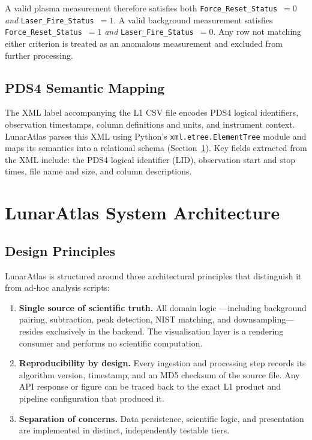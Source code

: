 \documentclass[a4paper,twocolumn,10pt]{article}
\begin{document}
A valid plasma measurement therefore satisfies both
\texttt{Force\_Reset\_Status}~$=0$ \emph{and}
\texttt{Laser\_Fire\_Status}~$=1$.  A valid background measurement
satisfies \texttt{Force\_Reset\_Status}~$=1$ \emph{and}
\texttt{Laser\_Fire\_Status}~$=0$.  Any row not matching either
criterion is treated as an anomalous measurement and excluded from
further processing.

\subsection{PDS4 Semantic Mapping}

The XML label accompanying the L1 CSV file encodes PDS4 logical
identifiers, observation timestamps, column definitions and units, and
instrument context.  LunarAtlas parses this XML using Python's
\texttt{xml.etree.ElementTree} module and maps its semantics into a
relational schema (Section~\ref{sec:architecture}).  Key fields
extracted from the XML include: the PDS4 logical identifier (LID),
observation start and stop times, file name and size, and column
descriptions.


\section{LunarAtlas System Architecture}
\label{sec:architecture}

\subsection{Design Principles}

LunarAtlas is structured around three architectural principles that
distinguish it from ad-hoc analysis scripts:

\begin{enumerate}[nosep,leftmargin=*]
  \item \textbf{Single source of scientific truth.}  All domain logic
    ---including background pairing, subtraction, peak detection,
    NIST matching, and downsampling---resides exclusively in the
    backend.  The visualisation layer is a rendering consumer and
    performs no scientific computation.

  \item \textbf{Reproducibility by design.}  Every ingestion and
    processing step records its algorithm version, timestamp, and an
    MD5 checksum of the source file.  Any API response or figure can
    be traced back to the exact L1 product and pipeline configuration
    that produced it.

  \item \textbf{Separation of concerns.}  Data persistence, scientific
    logic, and presentation are implemented in distinct, independently
    testable tiers.
\end{enumerate}
\end{document}
